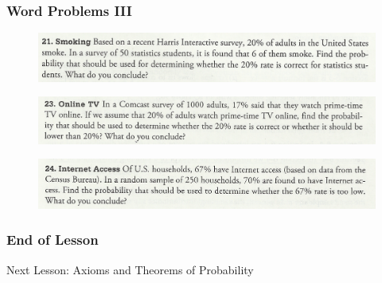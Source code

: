 \documentclass[xcolor=dvipsnames]{beamer}
\begin{document}
\begin{frame}
  \frametitle{Word Problems III}
  \begin{figure}[h]
    \includegraphics[scale=.7]{./diagrams/triola4.png}
  \end{figure}
  \begin{figure}[h]
    \includegraphics[scale=.7]{./diagrams/triola5.png}
  \end{figure}
  \begin{figure}[h]
    \includegraphics[scale=.7]{./diagrams/triola6.png}
  \end{figure}
\end{frame}

\begin{frame}
  \frametitle{End of Lesson}
Next Lesson: Axioms and Theorems of Probability
\end{frame}
\end{document}
